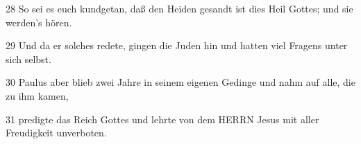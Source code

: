 \par 28 So sei es euch kundgetan, daß den Heiden gesandt ist dies Heil Gottes; und sie werden's hören.
\par 29 Und da er solches redete, gingen die Juden hin und hatten viel Fragens unter sich selbst.
\par 30 Paulus aber blieb zwei Jahre in seinem eigenen Gedinge und nahm auf alle, die zu ihm kamen,
\par 31 predigte das Reich Gottes und lehrte von dem HERRN Jesus mit aller Freudigkeit unverboten.

